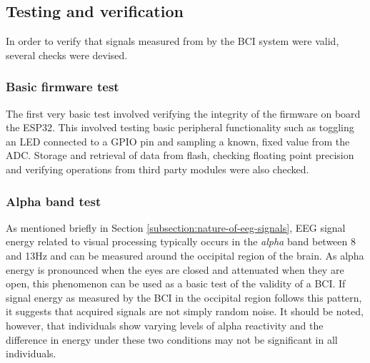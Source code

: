 \newpage
\subsection{Testing and verification}
\label{subsection:testing-verification-method-c4}
In order to verify that signals measured from by the BCI system were valid, several checks were devised. 

\subsubsection{Basic firmware test}
The first very basic test involved verifying the integrity of the firmware on board the ESP32. This involved testing basic peripheral functionality such as toggling an LED connected to a GPIO pin and sampling a known, fixed value from the ADC. Storage and retrieval of data from flash, checking floating point precision and verifying operations from third party modules were also checked. 

\subsubsection{Alpha band test}
As mentioned briefly in Section \ref{subsection:nature-of-eeg-signals}, EEG signal energy related to visual processing typically occurs in the \textit{alpha} band between 8 and 13Hz and can be measured around the occipital region of the brain. As alpha energy is pronounced when the eyes are closed and attenuated when they are open, this phenomenon can be used as a basic test of the validity of a BCI. If signal energy as measured by the BCI in the occipital region follows this pattern, it suggests that acquired signals are not simply random noise. It should be noted, however, that individuals show varying levels of alpha reactivity and the difference in energy under these two conditions may not be significant in all individuals. 


